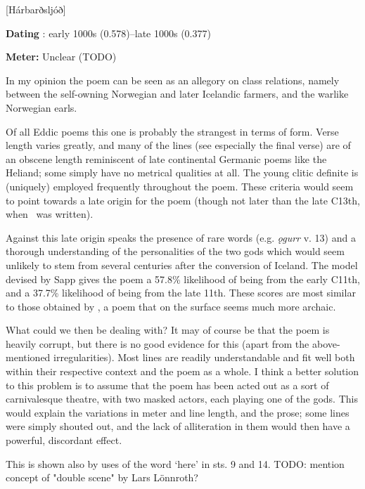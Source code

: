 [Hárbarðsljóð]

\begin{flushright}%
\textbf{Dating} \parencite{Sapp2022}: early 1000s (0.578)–late 1000s (0.377)

\textbf{Meter:} Unclear (TODO)%
\end{flushright}

In my opinion the poem can be seen as an allegory on class relations, namely between the self-owning Norwegian and later Icelandic farmers, and the warlike Norwegian earls.

Of all Eddic poems this one is probably the strangest in terms of form. Verse length varies greatly, and many of the lines (see especially the final verse) are of an obscene length reminiscent of late continental Germanic poems like the Heliand; some simply have no metrical qualities at all. The young clitic definite is (uniquely) employed frequently throughout the poem. These criteria would seem to point towards a late origin for the poem (though not later than the late C13th, when \Regius\ was written).

Against this late origin speaks the presence of rare words (e.g. \emph{ǫgurr} v. 13) and a thorough understanding of the personalities of the two gods which would seem unlikely to stem from several centuries after the conversion of Iceland. The model devised by Sapp gives the poem a 57.8\% likelihood of being from the early C11th, and a 37.7\% likelihood of being from the late 11th. These scores are most similar to those obtained by \Gripisspa, a poem that on the surface seems much more archaic.

What could we then be dealing with? It may of course be that the poem is heavily corrupt, but there is no good evidence for this (apart from the above-mentioned irregularities). Most lines are readily understandable and fit well both within their respective context and the poem as a whole. I think a better solution to this problem is to assume that the poem has been acted out as a sort of carnivalesque theatre, with two masked actors, each playing one of the gods. This would explain the variations in meter and line length, and the prose; some lines were simply shouted out, and the lack of alliteration in them would then have a powerful, discordant effect.

This is shown also by uses of the word ‘here’ in sts. 9 and 14. TODO: mention concept of "double scene" by Lars Lönnroth?


\sectionline



